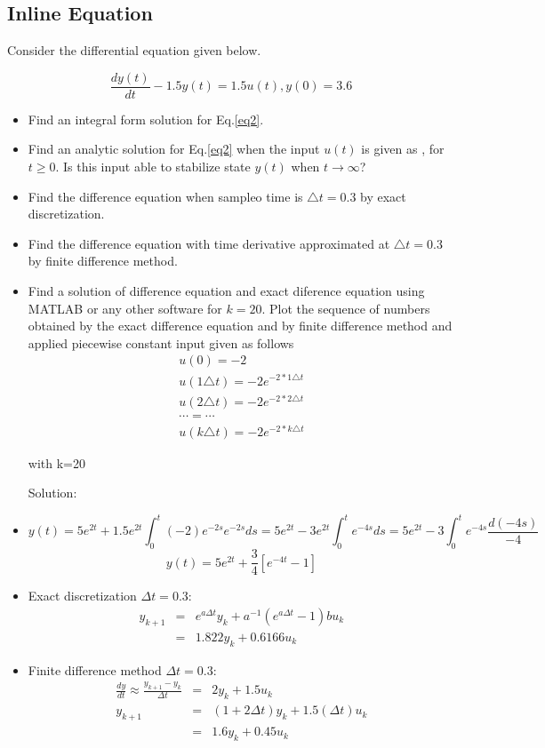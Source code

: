 \documentclass[11pt]{article}
\newcommand{\aDE}[4]{\begin{center}\begin{equation}\label{#4}\frac{{dy(t)}}{{dt}} -#1y(t) = #2u(t),y(0) = #3 \end{equation}\end{center}}
\begin{document}
\subsection{Inline Equation}
\label{sec-1-3}
Consider the differential equation given below.
\aDE{1.5}{1.5}{3.6}{eq2}
\begin{itemize}
\item Find an integral form solution for Eq.\ref{eq2}.
\item Find an analytic solution for Eq.\ref{eq2} when the input \(u(t)\) is  given as , for \(t\ge 0\). Is this input able to stabilize state \(y(t)\) when \( t\rightarrow  \infty\)?
\item Find the difference equation when sampleo time is \(\triangle t=0.3\) by exact discretization.
\item Find the difference equation with time derivative approximated at \(\triangle t=0.3\) by finite difference method.
\item Find a solution of difference equation and exact diference equation using  MATLAB or any other software for \(k=20\).  Plot the sequence of numbers obtained by the exact difference equation and by finite difference method and applied piecewise constant input given as follows
\[ \begin{array}{c} u(0) = -2 \\u(1\triangle t) = -2e^{-2*1\triangle t} \\ u(2\triangle t) = -2e^{-2*2\triangle t} \\ \cdots=\cdots \\ u(k\triangle t)= -2e^{-2*k\triangle t}\end{array} \]

with k=20

Solution:
\end{itemize}







\begin{itemize}
\item \[y(t)=5e^{2t}+1.5e^{2t}\int_0^t (-2) e^{-2s}e^{-2s}ds= 5e^{2t}-3e^{2t} \int_0^t e^{-4s}ds=5e^{2t}-3\int_0^t e^{-4s}\frac{d(-4s)}{-4} \]
       \[y(t)=5e^{2t}+\frac{3}{4}\left[e^{-4t}-1\right]\]
\item Exact discretization \(\Delta t = 0.3\):
\[\begin{array}{rcl}
       y_{k+1} &=& e^{a\Delta t}y_{k} + a^{-1}(e^{a\Delta t}-1)bu_{k} \\[0.25cm]
       &=& 1.822y_{k} + 0.6166u_{k}
       \end{array}\]

\item Finite difference method \(\Delta t=0.3\):
\[\begin{array}{rcl}  \frac{dy}{dt} \approx \frac{y_{k+1}-y_{k}}{\Delta t} &=& 2y_{k} + 1.5u_{k} \\[0.25cm]
         y_{k+1} &=& (1+2\Delta t)y_{k} + 1.5(\Delta t )u_{k} \\[0.25cm]
         &=& 1.6y_{k} + 0.45u_{k}
         \end{array}\]
\end{itemize}
\end{document}
